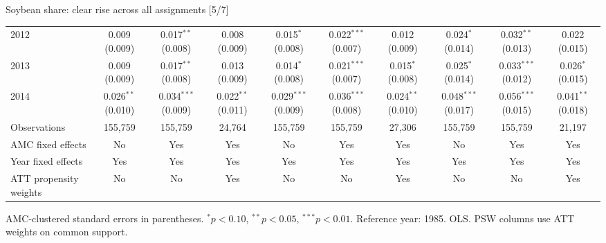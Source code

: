 \documentclass[aspectratio=169]{beamer}
\begin{document}
\begin{frame}{Soybean share: clear rise across all assignments [5/7]}
{\begin{tabular}{@{}l*{9}{c}@{}}
2012 & \shortstack{0.009\\(0.009)} & \shortstack{0.017$^{**}$\\(0.008)} & \shortstack{0.008\\(0.009)} & \shortstack{0.015$^{*}$\\(0.008)} & \shortstack{0.022$^{***}$\\(0.007)} & \shortstack{0.012\\(0.009)} & \shortstack{0.024$^{*}$\\(0.014)} & \shortstack{0.032$^{**}$\\(0.013)} & \shortstack{0.022\\(0.015)} \\
2013 & \shortstack{0.009\\(0.009)} & \shortstack{0.017$^{**}$\\(0.008)} & \shortstack{0.013\\(0.009)} & \shortstack{0.014$^{*}$\\(0.008)} & \shortstack{0.021$^{***}$\\(0.007)} & \shortstack{0.015$^{*}$\\(0.008)} & \shortstack{0.025$^{*}$\\(0.014)} & \shortstack{0.033$^{***}$\\(0.012)} & \shortstack{0.026$^{*}$\\(0.015)} \\
2014 & \shortstack{0.026$^{**}$\\(0.010)} & \shortstack{0.034$^{***}$\\(0.009)} & \shortstack{0.022$^{**}$\\(0.011)} & \shortstack{0.029$^{***}$\\(0.009)} & \shortstack{0.036$^{***}$\\(0.008)} & \shortstack{0.024$^{**}$\\(0.010)} & \shortstack{0.048$^{***}$\\(0.017)} & \shortstack{0.056$^{***}$\\(0.015)} & \shortstack{0.041$^{**}$\\(0.018)} \\
\midrule
Observations & 155,759 & 155,759 & 24,764 & 155,759 & 155,759 & 27,306 & 155,759 & 155,759 & 21,197 \\
AMC fixed effects & No & Yes & Yes & No & Yes & Yes & No & Yes & Yes \\
Year fixed effects & Yes & Yes & Yes & Yes & Yes & Yes & Yes & Yes & Yes \\
ATT propensity weights & No & No & Yes & No & No & Yes & No & No & Yes \\
\bottomrule
\end{tabular}%
}
\vspace{0.1em}
{\tiny\color{ZMidGray} AMC-clustered standard errors in parentheses. $^{*}p<0.10$, $^{**}p<0.05$, $^{***}p<0.01$. Reference year: 1985. OLS. PSW columns use ATT weights on common support.}
\end{frame}
\end{document}
